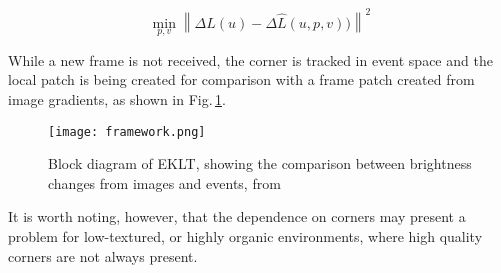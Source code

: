 \begin{equation}
    \label{eq:sec2_cost_eklt}
    \min_{p,v} \left \| \Delta L(u) - \Delta \hat{L}(u,p,v)) \right \| ^2
\end{equation}

While a new frame is not received, the corner is tracked in event space and the local patch is being created for comparison with a frame patch created from image gradients, as shown in Fig.\,\ref{fig:sec2_eklt_block}.

\begin{figure}[ht]
    \centering
    \texttt{[image: framework.png]}
    \caption[Block diagram of EKLT]{Block diagram of EKLT, showing the comparison between brightness changes from images and events, from \cite{gehrig2020eklt}}
    \label{fig:sec2_eklt_block}
\end{figure}

It is worth noting, however, that the dependence on corners may present a problem for low-textured, or highly organic environments, where high quality corners are not always present.
